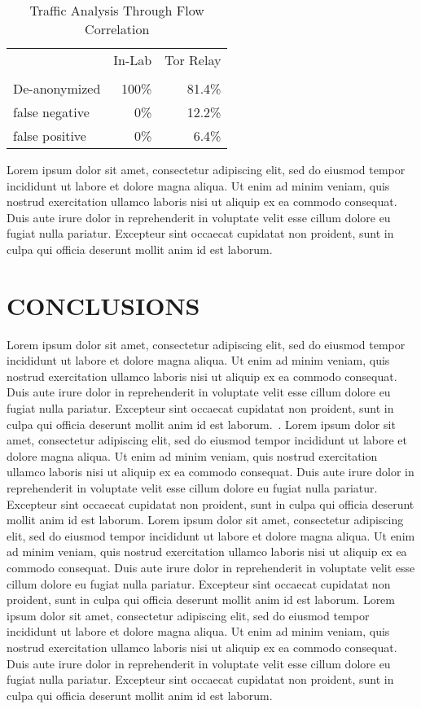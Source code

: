 \documentclass[letterpaper, 10 pt, conference]{ieeeconf}  %
\begin{document}
\begin{center}
\begin{table}[ht]
	\caption{Traffic Analysis Through Flow Correlation}
	\centering
	\begin{tabular}{l r r}
		\hline\hline
		\ \ & In-Lab & Tor Relay \\\\ [0.5ex] 
		\hline
		De-anonymized&100\%&81.4\% \\
		false negative&0\%&12.2\% \\
		false positive&0\%&6.4\%\\ [1ex]
		\hline
	\end{tabular}
	\label{table:nonlin}
\end{table}
\end{center} 

Lorem ipsum dolor sit amet, consectetur adipiscing elit, sed do eiusmod tempor incididunt ut labore et dolore magna aliqua. Ut enim ad minim veniam, quis nostrud exercitation ullamco laboris nisi ut aliquip ex ea commodo consequat. Duis aute irure dolor in reprehenderit in voluptate velit esse cillum dolore eu fugiat nulla pariatur. Excepteur sint occaecat cupidatat non proident, sunt in culpa qui officia deserunt mollit anim id est laborum.

\section{CONCLUSIONS}

Lorem ipsum dolor sit amet, consectetur adipiscing elit, sed do eiusmod tempor incididunt ut labore et dolore magna aliqua. Ut enim ad minim veniam, quis nostrud exercitation ullamco laboris nisi ut aliquip ex ea commodo consequat. Duis aute irure dolor in reprehenderit in voluptate velit esse cillum dolore eu fugiat nulla pariatur. Excepteur sint occaecat cupidatat non proident, sunt in culpa qui officia deserunt mollit anim id est laborum.~\cite{Cite16}. Lorem ipsum dolor sit amet, consectetur adipiscing elit, sed do eiusmod tempor incididunt ut labore et dolore magna aliqua. Ut enim ad minim veniam, quis nostrud exercitation ullamco laboris nisi ut aliquip ex ea commodo consequat. Duis aute irure dolor in reprehenderit in voluptate velit esse cillum dolore eu fugiat nulla pariatur. Excepteur sint occaecat cupidatat non proident, sunt in culpa qui officia deserunt mollit anim id est laborum. Lorem ipsum dolor sit amet, consectetur adipiscing elit, sed do eiusmod tempor incididunt ut labore et dolore magna aliqua. Ut enim ad minim veniam, quis nostrud exercitation ullamco laboris nisi ut aliquip ex ea commodo consequat. Duis aute irure dolor in reprehenderit in voluptate velit esse cillum dolore eu fugiat nulla pariatur. Excepteur sint occaecat cupidatat non proident, sunt in culpa qui officia deserunt mollit anim id est laborum. Lorem ipsum dolor sit amet, consectetur adipiscing elit, sed do eiusmod tempor incididunt ut labore et dolore magna aliqua. Ut enim ad minim veniam, quis nostrud exercitation ullamco laboris nisi ut aliquip ex ea commodo consequat. Duis aute irure dolor in reprehenderit in voluptate velit esse cillum dolore eu fugiat nulla pariatur. Excepteur sint occaecat cupidatat non proident, sunt in culpa qui officia deserunt mollit anim id est laborum.
\end{document}
